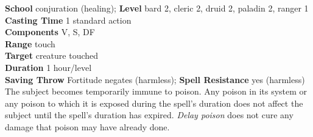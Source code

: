 \textbf{School} conjuration (healing); \textbf{Level} bard 2, cleric 2, druid 2, paladin 2, ranger 1\\
\textbf{Casting Time} 1 standard action\\
\textbf{Components} V, S, DF\\
\textbf{Range} touch\\
\textbf{Target} creature touched\\
\textbf{Duration} 1 hour/level\\
\textbf{Saving Throw} Fortitude negates (harmless); \textbf{Spell Resistance} yes (harmless)\\
The subject becomes temporarily immune to poison. Any poison in its system or any poison to which it is exposed during the spell's duration does not affect the subject until the spell's duration has expired. \textit{Delay poison }does not cure any damage that poison may have already done.\\
